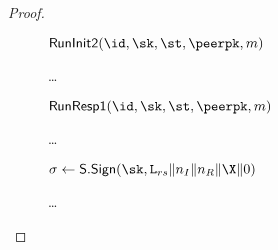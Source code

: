 \begin{proof}
\begin{collectinmacro}{\SIGMIProofSignatureMAC}{}{}
\begin{figure}[tp]
\begin{minipage}[t]{0.49\textwidth}
\begin{oracle}{$\RunInit(\id,\sk,\st,\peerpk,m)$}
			\skipline
			\skipline
			\item \dots
		\end{oracle}

		\ExptSepSpace

		\begin{oracle}{$\RunRespI(\id,\sk,\st,\peerpk,m)$}
			\item \dots
			\item $\sigma \gets \SIGScheme.\SIGSign(\sk,\labelrs\|\nonce_I\|\nonce_R\|\X\|\Y)$
			\item {}
			\item \dots

\end{oracle}
\end{minipage}
\end{figure}
\end{collectinmacro}
\end{proof}
